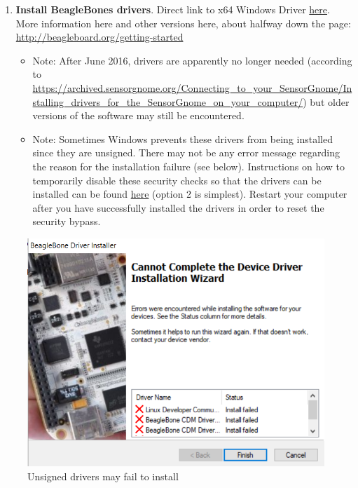 \documentclass[
]{book}
\begin{document}
\begin{enumerate}
\def\labelenumi{\arabic{enumi}.}
\item
  \textbf{Install BeagleBones drivers}. Direct link to x64 Windows Driver \href{https://beagleboard.org/static/Drivers/Windows/BONE_D64.exe}{here}. More information here and other versions here, about halfway down the page: \url{http://beagleboard.org/getting-started}

  \begin{itemize}
  \item
    Note: After June 2016, drivers are apparently no longer needed (according to \url{https://archived.sensorgnome.org/Connecting_to_your_SensorGnome/Installing_drivers_for_the_SensorGnome_on_your_computer/}) but older versions of the software may still be encountered.
  \item
    Note: Sometimes Windows prevents these drivers from being installed since they are unsigned. There may not be any error message regarding the reason for the installation failure (see below). Instructions on how to temporarily disable these security checks so that the drivers can be installed can be found \href{https://www.howtogeek.com/167723/how-to-disable-driver-signature-verification-on-64-bit-windows-8.1-so-that-you-can-install-unsigned-drivers/}{here} (option 2 is simplest). Restart your computer after you have successfully installed the drivers in order to reset the security bypass.
  \end{itemize}
\end{enumerate}

\begin{figure}

{\centering \includegraphics[width=8.65in]{images/driverfail} 

}

\caption{Unsigned drivers may fail to install}\label{fig:unnamed-chunk-2}
\end{figure}
\end{document}
